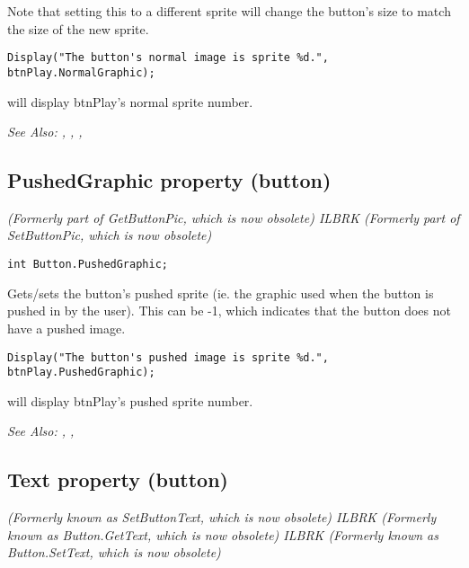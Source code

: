 Note that setting this to a different sprite will change the button's size to match the size of the new sprite.

\begin{verbatim}
Display("The button's normal image is sprite %d.", btnPlay.NormalGraphic);
\end{verbatim}
will display btnPlay's normal sprite number.

\it{See Also:} 
,
,
,


\subsection{PushedGraphic property (button)}\label{Button.PushedGraphic}%

\it{(Formerly part of GetButtonPic, which is now obsolete)} ILBRK
\it{(Formerly part of SetButtonPic, which is now obsolete)}

\begin{verbatim}
int Button.PushedGraphic;
\end{verbatim}
Gets/sets the button's pushed sprite (ie. the graphic used when the button is pushed
in by the user). This can be -1, which indicates that the button does not have a pushed
image.

\begin{verbatim}
Display("The button's pushed image is sprite %d.", btnPlay.PushedGraphic);
\end{verbatim}
will display btnPlay's pushed sprite number.

\it{See Also:} ,
,


\subsection{Text property (button)}\label{Button.Text}%

\it{(Formerly known as SetButtonText, which is now obsolete)} ILBRK
\it{(Formerly known as Button.GetText, which is now obsolete)} ILBRK
\it{(Formerly known as Button.SetText, which is now obsolete)}

